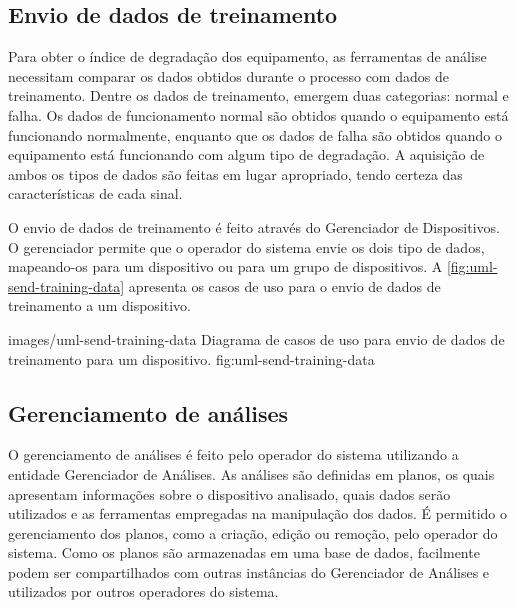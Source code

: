 %


\subsection{Envio de dados de treinamento}

Para obter o índice de degradação dos equipamento, as ferramentas de análise necessitam comparar os
dados obtidos durante o processo com dados de treinamento. Dentre os dados de treinamento, emergem
duas categorias: normal e falha. Os dados de funcionamento normal são obtidos quando o equipamento
está funcionando normalmente, enquanto que os dados de falha são obtidos quando o equipamento está
funcionando com algum tipo de degradação. A aquisição de ambos os tipos de dados são feitas em lugar
apropriado, tendo certeza das características de cada sinal.

O envio de dados de treinamento é feito através do Gerenciador de Dispositivos. O gerenciador
permite que o operador do sistema envie os dois tipo de dados, mapeando-os para um dispositivo ou
para um grupo de dispositivos. A \cref{fig:uml-send-training-data} apresenta os casos de uso para o
envio de dados de treinamento a um dispositivo.

  {images/uml-send-training-data}
  {Diagrama de casos de uso para envio de dados de treinamento para um dispositivo.}
  {fig:uml-send-training-data}


\subsection{Gerenciamento de análises}

O gerenciamento de análises é feito pelo operador do sistema utilizando a entidade Gerenciador de
Análises. As análises são definidas em planos, os quais apresentam informações sobre o dispositivo
analisado, quais dados serão utilizados e as ferramentas empregadas na manipulação dos dados. É
permitido o gerenciamento dos planos, como a criação, edição ou remoção, pelo operador do sistema.
Como os planos são armazenadas em uma base de dados, facilmente podem ser compartilhados com outras
instâncias do Gerenciador de Análises e utilizados por outros operadores do sistema.

